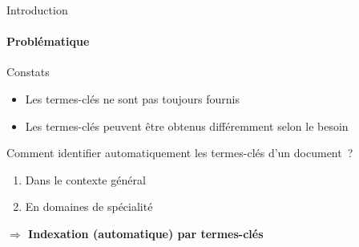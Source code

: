 \begin{frame}{Introduction}\framesubtitle{Problématique}
  \begin{alertblock}{Constats}
    \begin{itemize}
      \item{Les termes-clés ne sont pas toujours fournis}
      \item{Les termes-clés peuvent être obtenus différemment selon le besoin}
    \end{itemize}
  \end{alertblock}

  \vspace{1em}

  Comment identifier automatiquement les termes-clés d'un document~?
  \begin{enumerate}
    \item{Dans le contexte général}
    \item{En domaines de spécialité}
  \end{enumerate}

  \vspace{1em}

  \large\textbf{$\Rightarrow$ Indexation (automatique) par termes-clés}
\end{frame}

